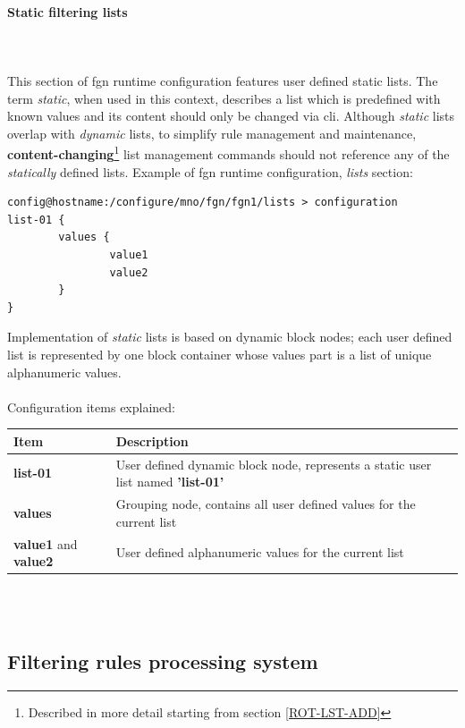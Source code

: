 \documentclass[a4paper,latin]{paper}
\begin{document}
\paragraph{Static filtering lists}\label{SECTION_8_1_3_3}\mbox{}\\\\
This section of \acrshort{fgn} runtime configuration features user defined static lists. The term \textit{static}, when used in this context,
describes a list which is predefined with known values and its content should only be changed via \acrfull{cli}. Although \textit{static} lists overlap with
\textit{dynamic} lists, to simplify rule management and maintenance, \textbf{content-changing}\footnote{Described in more detail starting from section \ref{ROT-LST-ADD}} 
list management commands should not reference any of the \textit{statically} defined lists. 
\clearpage
\noindent{}Example of \acrfull{fgn} runtime configuration, \textit{lists} section:
\begin{lstlisting}[style=BashInputStyle, belowskip=\baselineskip]
config@hostname:/configure/mno/fgn/fgn1/lists > configuration 
list-01 {
        values {
                value1          
                value2          
        }                       
}
\end{lstlisting}
Implementation of \textit{static} lists is based on dynamic block nodes; each user defined list is 
represented by one block container whose values part is a list of unique alphanumeric values.\\\\
\noindent{}Configuration items explained:\\
\begin{tabularx}{\textwidth}{ | l | X | }
	\hline
	Item 						& Description \\
	\hline
	\textbf{list-01}				& User defined dynamic block node, represents a static user list named \textbf{'list-01'} \\
	\textbf{values}					& Grouping node, contains all user defined values for the current list \\
	\textbf{value1} and \textbf{value2}		& User defined alphanumeric values for the current list \\
	\hline
\end{tabularx}\\\\

\subsection{Filtering rules processing system}\label{SECTION_8_2}
\end{document}
